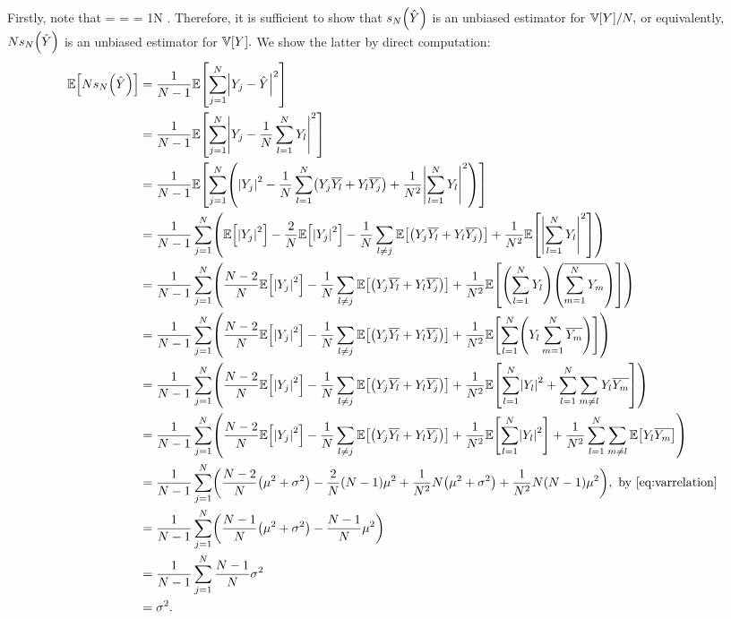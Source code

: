 Firstly, note that
\beqs
\VAR{\Yhat} =  =   = \frac1N .
\eeqs
Therefore, it is sufficient to show that $\unbiased{\Yhat}{N}$ is an unbiased estimator for $\VAR{Y}/N,$ or equivalently, $N\unbiased{\Yhat}{N}$ is an unbiased estimator for $\VAR{Y}.$ We show the latter by direct computation:
\begin{align*}
  \EXP{N\unbiased{\Yhat}{N}} &= \frac1{N-1} \EXP{\sum_{j=1}^N \abs{\Yj - \Yhat}^2}\\
  &= \frac1{N-1}\EXP{\sum_{j=1}^N \abs{\Yj  - \frac1{N} \sum_{l=1}^N \Yl}^2}\\
  & = \frac1{N-1} \EXP{\sum_{j=1}^N\mleft(\abs{\Yj}^2 - \frac1N \sum_{l=1}^N \mleft(\Yj \Ylbar + \Yl\Yjbar\mright) + \frac1{N^2} \abs{\sum_{l=1}^N  \Yl}^2\mright)}\\
  & = \frac1{N-1} \sum_{j=1}^N\mleft(\EXP{\abs{\Yj}^2} -\frac2N \EXP{\abs{\Yj}^2} -\frac1N \sum_{l\neq j} \EXP{\mleft(\Yj \Ylbar + \Yl\Yjbar\mright)} + \frac1{N^2}\EXP{ \abs{\sum_{l=1}^N  \Yl}^2}\mright)\\
  & = \frac1{N-1} \sum_{j=1}^N\mleft(\frac{N-2}N\EXP{\abs{\Yj}^2}-\frac1N \sum_{l\neq j} \EXP{\mleft(\Yj \Ylbar + \Yl\Yjbar\mright)} + \frac1{N^2}\EXP{ \mleft(\sum_{l=1}^N\Yl\mright)\mleft(\overline{\sum_{m=1}^N  \Ym}\mright)}\mright)\\
  & = \frac1{N-1} \sum_{j=1}^N\mleft(\frac{N-2}N\EXP{\abs{\Yj}^2}-\frac1N \sum_{l\neq j} \EXP{\mleft(\Yj \Ylbar + \Yl\Yjbar\mright)} + \frac1{N^2}\EXP{ \sum_{l=1}^N\mleft(\Yl\sum_{m=1}^N  \Ymbar\mright)}\mright)\\
  & = \frac1{N-1} \sum_{j=1}^N\mleft(\frac{N-2}N\EXP{\abs{\Yj}^2}-\frac1N \sum_{l\neq j} \EXP{\mleft(\Yj \Ylbar + \Yl\Yjbar\mright)} + \frac1{N^2}\EXP{ \sum_{l=1}^N\abs{\Yl}^2 + \sum_{l=1}^N \sum_{m\neq l} \Yl \Ymbar}\mright)\\
  & = \frac1{N-1} \sum_{j=1}^N\mleft(\frac{N-2}N\EXP{\abs{\Yj}^2}-\frac1N \sum_{l\neq j} \EXP{\mleft(\Yj \Ylbar + \Yl\Yjbar\mright)} + \frac1{N^2}\EXP{ \sum_{l=1}^N\abs{\Yl}^2} +\frac1{N^2} \sum_{l=1}^N \sum_{m\neq l} \EXP{\Yl \Ymbar}\mright)\\
  &= \frac1{N-1} \sum_{j=1}^N \mleft(\frac{N-2}N \mleft(\mu^2 + \sigma^2\mright) - \frac2N \mleft(N-1\mright) \mu^2 + \frac1{N^2} N \mleft(\mu^2 + \sigma^2\mright) + \frac1{N^2} N \mleft(N-1\mright) \mu^2\mright),\text{ by \cref{eq:varrelation}}\\
  &= \frac1{N-1} \sum_{j=1}^N \mleft( \frac{N-1}N \mleft(\mu^2 + \sigma^2\mright) - \frac{N-1}{N} \mu^2\mright)\\
  &= \frac1{N-1} \sum_{j=1}^N \frac{N-1}N \sigma^2\\
  &= \sigma^2.
  \end{align*}
\epf
